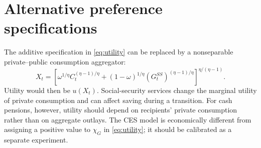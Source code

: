 \documentclass[12pt]{article}
\begin{document}
\section{Alternative preference specifications}

The additive specification in \eqref{eq:utility} can be replaced by a
nonseparable private--public consumption aggregator:
\begin{equation}
  X_t=
  \left[
    \omega^{1/\eta}C_t^{(\eta-1)/\eta}
    +(1-\omega)^{1/\eta}(G_t^{SS})^{(\eta-1)/\eta}
  \right]^{\eta/(\eta-1)}.
  \label{eq:public_private_ces}
\end{equation}
Utility would then be $u(X_t)$. Social-security services change the marginal
utility of private consumption and can affect saving during a transition.
For cash pensions, however, utility should depend on recipients' private
consumption rather than on aggregate outlays. The CES model is economically
different from assigning a positive value to
$\chi_G$ in \eqref{eq:utility}; it should be calibrated as a separate
experiment.



\end{document}
